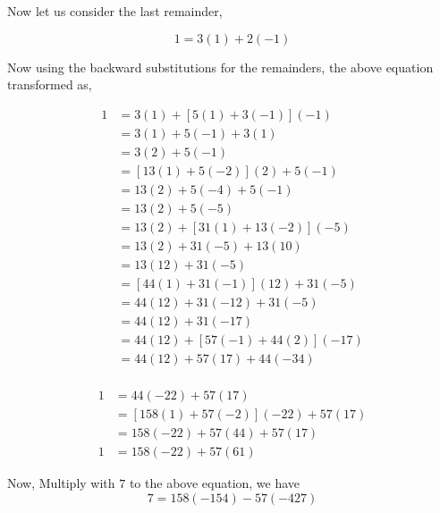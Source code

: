 \documentclass[a4paper,12pt]{article}
\begin{document}
    Now let us consider the last remainder,

    $$1  = 3(1) + 2(-1)$$

    Now using the backward substitutions for the remainders, the above equation transformed as,

    \begin{equation*}
        \begin{split}
            1 & = 3(1) + [5(1) + 3(-1)](-1) \\[2mm] 
            & = 3(1) + 5(-1) + 3(1) \\[2mm]
            & = 3(2) + 5(-1) \\[2mm]
            & = [13(1) + 5(-2)](2) + 5(-1) \\[2mm]
            & = 13(2) + 5(-4) + 5(-1) \\[2mm]
            & = 13(2) + 5(-5) \\[2mm]
            & = 13(2) + [31(1) + 13(-2)](-5) \\[2mm]
            & = 13(2) + 31(-5) + 13(10) \\[2mm]
            & = 13(12) + 31(-5)\\[2mm]
            & = [44(1) + 31(-1)](12) + 31(-5)\\[2mm]
            & = 44(12) + 31(-12) + 31(-5)\\[2mm]
            & = 44(12) + 31(-17)\\[2mm]
            & = 44(12) + [57(-1) + 44(2)](-17)\\[2mm]
            & = 44(12) + 57(17) + 44(-34)\\[2mm]
        \end{split}
    \end{equation*}

    \begin{equation*}
        \begin{split}
            1 & = 44(-22) + 57(17)\\[2mm]
            & = [158(1) + 57(-2)](-22) + 57(17)\\[2mm]
            & = 158(-22) + 57(44) + 57(17)\\[2mm]
            1 & = 158(-22) + 57(61)
        \end{split}
    \end{equation*}

    Now, Multiply with $7$ to the above equation, we have
    \begin{equation*}
        7 = 158(-154) - 57(-427) \tag{2}
    \end{equation*}
    
\end{document}
